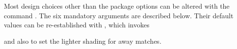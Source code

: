 \documentclass[a4paper,12pt]{ltxdoc}
\begin{document}
Most design choices other than the package options
can be altered with the command
\linebreak[2]%
\linebreak[2]%
\linebreak[2]%
\linebreak[2]%
\linebreak[2]%
\linebreak[2]%
. 
The six mandatory arguments are described below.
Their default values can be re-established with
, which invokes
\begin{quote}
\end{quote}
and also  to set the lighter shading for away matches.
\end{document}
